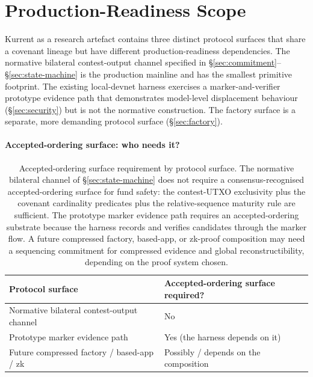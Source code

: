 \documentclass[10pt,a4paper]{article}
\begin{document}
\section{Production-Readiness Scope}
\label{sec:channel-factory-scope}

Kurrent as a research artefact contains three distinct protocol surfaces that share a covenant lineage but have different production-readiness dependencies. The normative bilateral contest-output channel specified in §\ref{sec:commitment}--§\ref{sec:state-machine} is the production mainline and has the smallest primitive footprint. The existing local-devnet harness exercises a marker-and-verifier prototype evidence path that demonstrates model-level displacement behaviour (§\ref{sec:security}) but is not the normative construction. The factory surface is a separate, more demanding protocol surface (§\ref{sec:factory}).

\paragraph{Accepted-ordering surface: who needs it?}

\begin{table}[ht]
\centering
\small
\renewcommand{\arraystretch}{1.2}
\begin{tabular}{@{}ll@{}}
\toprule
\textbf{Protocol surface} & \textbf{Accepted-ordering surface required?} \\
\midrule
Normative bilateral contest-output channel    & No \\
Prototype marker evidence path                & Yes (the harness depends on it) \\
Future compressed factory / based-app / zk    & Possibly / depends on the composition \\
\bottomrule
\end{tabular}
\caption{Accepted-ordering surface requirement by protocol surface. The normative bilateral channel of §\ref{sec:state-machine} does not require a consensus-recognised accepted-ordering surface for fund safety: the contest-UTXO exclusivity plus the covenant cardinality predicates plus the relative-sequence maturity rule are sufficient. The prototype marker evidence path requires an accepted-ordering substrate because the harness records and verifies candidates through the marker flow. A future compressed factory, based-app, or zk-proof composition may need a sequencing commitment for compressed evidence and global reconstructibility, depending on the proof system chosen.}
\label{tab:accepted-ordering}
\end{table}
\end{document}
